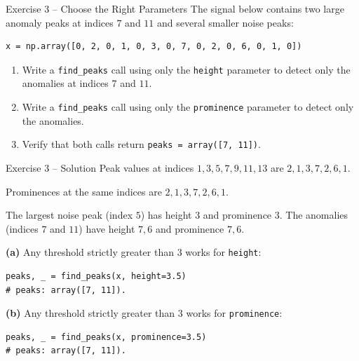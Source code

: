 \documentclass{beamer}
\begin{document}
\begin{frame}[fragile]{Exercise 3 -- Choose the Right Parameters}
  The signal below contains two large anomaly peaks at indices \(7\) and \(11\) and several smaller noise peaks:
  \begin{lstlisting}
x = np.array([0, 2, 0, 1, 0, 3, 0, 7, 0, 2, 0, 6, 0, 1, 0])
  \end{lstlisting}
  \begin{enumerate}
    \item[(a)] Write a \texttt{find\_peaks} call using only the \texttt{height} parameter to detect only the anomalies at indices \(7\) and \(11\).
    \item[(b)] Write a \texttt{find\_peaks} call using only the \texttt{prominence} parameter to detect only the anomalies.
    \item[(c)] Verify that both calls return \texttt{peaks = array([7, 11])}.
  \end{enumerate}
\end{frame}

\begin{frame}[fragile]{Exercise 3 -- Solution}
  Peak values at indices \(1, 3, 5, 7, 9, 11, 13\) are \(2, 1, 3, 7, 2, 6, 1\).

  Prominences at the same indices are \(2, 1, 3, 7, 2, 6, 1\).

  The largest noise peak (index \(5\)) has height \(3\) and prominence \(3\).
  The anomalies (indices \(7\) and \(11\)) have height \(7, 6\) and prominence \(7, 6\).

  \textbf{(a)} Any threshold strictly greater than \(3\) works for \texttt{height}:
  \begin{lstlisting}
peaks, _ = find_peaks(x, height=3.5)
# peaks: array([7, 11]).
  \end{lstlisting}
  \textbf{(b)} Any threshold strictly greater than \(3\) works for \texttt{prominence}:
  \begin{lstlisting}
peaks, _ = find_peaks(x, prominence=3.5)
# peaks: array([7, 11]).
  \end{lstlisting}
\end{frame}
\end{document}
